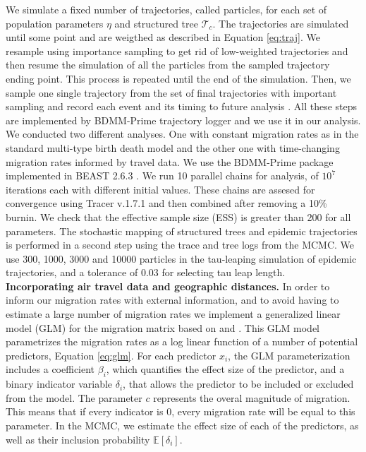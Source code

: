 We simulate a fixed number of trajectories, called particles, for each set of population parameters $\eta$ and structured tree $\mathcal{T}_c$. The trajectories are simulated until some point and are weigthed as described in Equation \ref{eq:traj}. We resample using importance sampling to get rid of low-weighted trajectories and then resume the simulation of all the particles from the sampled trajectory ending point. This process is repeated until the end of the simulation. Then, we sample one single trajectory from the set of final trajectories with important sampling and record each event and its timing to future analysis \cite{VaughanWIP}. All these steps are implemented by BDMM-Prime trajectory logger and we use it in our analysis.\\

We conducted two different analyses. One with constant migration rates as in the standard multi-type birth death model and the other one with time-changing migration rates informed by travel data. We use the BDMM-Prime package \cite{bdmmp} implemented in BEAST 2.6.3 \cite{beast}. We run 10 parallel chains for analysis, of $10^7$ iterations each with different initial values. These chains are assesed for convergence using Tracer v.1.7.1 and then combined after removing a 10\% burnin. We check that the effective sample size (ESS) is greater than 200 for all parameters. The stochastic mapping of structured trees and epidemic trajectories is performed in a second step using the trace and tree logs from the MCMC. We use 300, 1000, 3000 and 10000 particles in the tau-leaping simulation of epidemic trajectories, and a tolerance of 0.03 for selecting tau leap length.\\


\textbf{Incorporating air travel data and geographic distances.}
 In order to inform our migration rates with external information, and to avoid having to estimate a large number of migration rates we implement a generalized linear model (GLM) for the migration matrix based on \cite{Lemey2014} and \cite{Nicola2019}. This GLM model parametrizes the migration rates as a log linear function of a number of potential predictors, Equation \ref{eq:glm}. For each predictor $x_i$, the GLM parameterization includes a coefficient $\beta_i$, which quantifies the effect size of the predictor, and a binary indicator variable $\delta_i$, that allows the predictor to be included or excluded from the model. The parameter $c$ represents the overal magnitude of migration. This means that if every indicator is 0, every migration rate will be equal to this parameter. In the MCMC, we estimate the effect size of each of the predictors, as well as their inclusion probability $\mathbb{E}[\delta_i]$.


